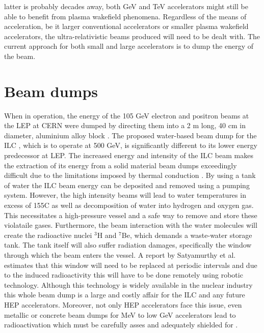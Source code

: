 latter is probably decades away, both GeV and TeV accelerators might still be able to benefit from plasma wakefield phenomena. Regardless of the means of acceleration, be it larger conventional accelerators or smaller plasma wakefield accelerators, the ultra-relativistic beams produced will need to be dealt with. The current approach for both small and large accelerators is to dump the energy of the beam. \vspace{-8pt}
\section{Beam dumps}\vspace{-8pt}
When in operation, the energy of the 105 GeV electron and positron beams at the LEP at CERN were dumped by directing them into a 2 m long, 40 cm in diameter, aluminium alloy block \cite{LEP_dump}. The proposed water-based beam dump for the ILC \cite{Satyamurthy2012}, which is to operate at 500 GeV, is significantly different to its lower energy predecessor at LEP. The increased energy and intensity of the ILC beam makes the extraction of its energy from a solid material beam dumps exceedingly difficult due to the limitations imposed by thermal conduction \cite{Satyamurthy2012}. By using a tank of water the ILC beam energy can be deposited and removed using a pumping system. However, the high intensity beams will lead to water temperatures in excess of 155\degree C as well as decomposition of water into hydrogen and oxygen gas. This necessitates a high-pressure vessel and a safe way to remove and store these violataile gases. Furthermore, the beam interaction with the water molecules will create the radioactive nuclei ${}^{3}$H and ${}^{7}$Be, which demands a waste-water storage tank. The tank itself will also suffer radiation damages, specifically the window through which the beam enters the vessel. A report by Satyamurthy et al. \cite{Satyamurthy2012} estimates that this window will need to be replaced at periodic intervals and due to the induced radioactivity this will have to be done remotely using robotic technology. Although this technology is widely available in the nuclear industry this whole beam dump is a large and costly affair for the ILC and any future HEP accelerators. Moreover, not only HEP accelerators face this issue, even metallic or concrete beam dumps for MeV to low GeV accelerators lead to radioactivation which must be carefully asses and adequately shielded for \cite{Schumann2009, Leuschner1998}. 



